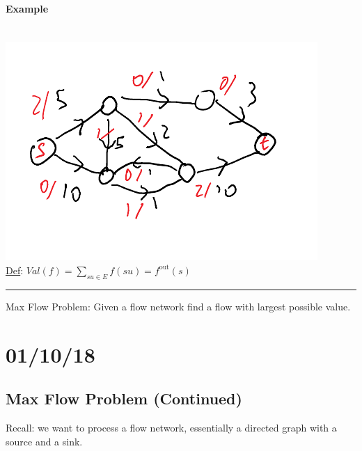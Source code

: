 \documentclass[12 pt]{article}
\begin{document}
            \paragraph{Example}~\\
                \includegraphics[width=.7\linewidth]{i3.pdf}
            \\ \underline{Def}: $Val(f) = \sum_{su\in E} f(su) =
            f^{\text{out}}(s)$
            \\\noindent\rule{\textwidth}{0.5pt}
            Max Flow Problem: Given a flow network find a flow with
            largest possible value.
    \section{01/10/18}
        \subsection{Max Flow Problem (Continued)}
        Recall: we want to process a flow network, essentially a
        directed graph with a source and a sink.
\end{document}

